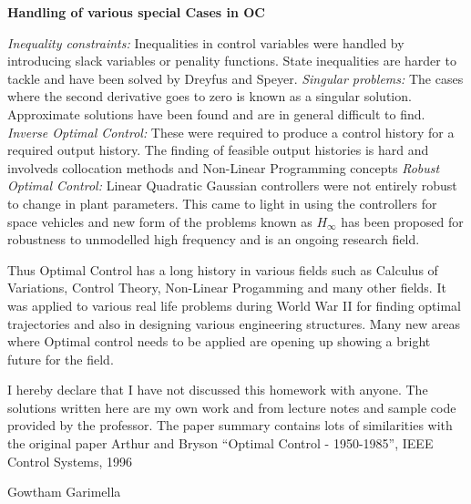 \begin{enumerate}
\textbf{Handling of various special Cases in OC}

\emph{Inequality constraints:} \quad
Inequalities in control variables were handled by introducing slack variables or penality functions. State inequalities are harder to tackle and have been solved by Dreyfus and Speyer. 
\emph{Singular problems:} \quad
The cases where the second derivative goes to zero is known as a singular solution. Approximate solutions have been found and are in general difficult to find.
\emph{Inverse Optimal Control:} \quad
These were required to produce a control history for a required output history. The finding of feasible output histories is hard and involveds collocation methods and Non-Linear Programming concepts
\emph{Robust Optimal Control:} \quad
Linear Quadratic Gaussian controllers were not entirely robust to change in plant parameters. This came to light in using the controllers for space vehicles and new form of the problems known as $H_\infty$ has been proposed for robustness to unmodelled high frequency and is an ongoing research field.

Thus Optimal Control has a long history in various fields such as Calculus of Variations, Control Theory, Non-Linear Progamming and many other fields. It was applied to various real life problems during World War II  for finding optimal trajectories and also in designing various engineering structures. Many new areas where Optimal control needs to be applied are opening up showing a bright future for the field.


\end{enumerate} 
\begin{acknowledgements}
I hereby declare that I have not discussed this homework with anyone. The
solutions written here are my own work and  from lecture notes and sample code
provided by the professor. The paper summary contains lots of similarities with the original paper Arthur and Bryson ``Optimal Control - 1950-1985'', IEEE Control Systems, 1996

\flushright Gowtham Garimella
\end{acknowledgements}






